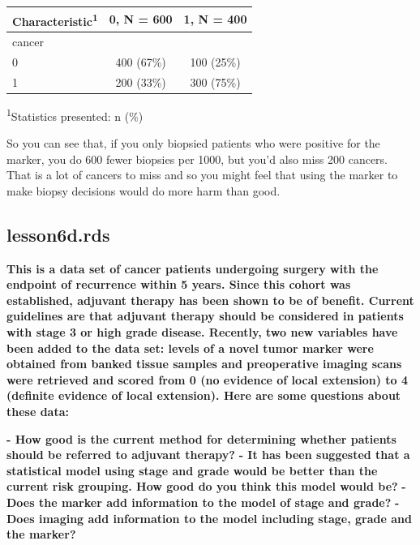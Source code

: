 \documentclass[]{book}
\begin{document}
\captionsetup[table]{labelformat=empty,skip=1pt}
\begin{longtable}{lcc}
\toprule
\textbf{Characteristic}\textsuperscript{1} & \textbf{0}, N = 600 & \textbf{1}, N = 400 \\ 
\midrule
cancer &  &  \\ 
0 & 400 (67\%) & 100 (25\%) \\ 
1 & 200 (33\%) & 300 (75\%) \\ 
\bottomrule
\end{longtable}
\vspace{-5mm}
\begin{minipage}{\linewidth}
\textsuperscript{1}Statistics presented: n (\%) \\ 
\end{minipage}

So you can see that, if you only biopsied patients who were positive for the marker, you do 600 fewer biopsies per 1000, but you'd also miss 200 cancers. That is a lot of cancers to miss and so you might feel that using the marker to make biopsy decisions would do more harm than good.

\hypertarget{lesson6d.rds}{%
\subsection{lesson6d.rds}\label{lesson6d.rds}}

\textbf{This is a data set of cancer patients undergoing surgery with the endpoint of recurrence within 5 years. Since this cohort was established, adjuvant therapy has been shown to be of benefit. Current guidelines are that adjuvant therapy should be considered in patients with stage 3 or high grade disease. Recently, two new variables have been added to the data set: levels of a novel tumor marker were obtained from banked tissue samples and preoperative imaging scans were retrieved and scored from 0 (no evidence of local extension) to 4 (definite evidence of local extension). Here are some questions about these data:}

\textbf{- How good is the current method for determining whether patients should be referred to adjuvant therapy?}
\textbf{- It has been suggested that a statistical model using stage and grade would be better than the current risk grouping. How good do you think this model would be?}
\textbf{- Does the marker add information to the model of stage and grade?}
\textbf{- Does imaging add information to the model including stage, grade and the marker?}
\end{document}
